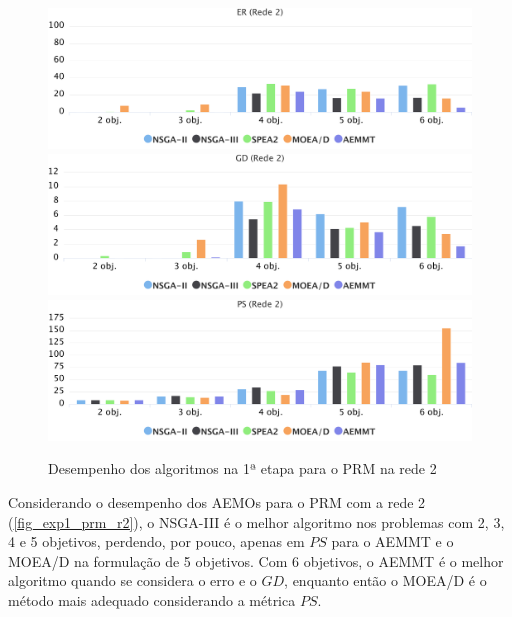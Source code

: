\begin{figure}[!htbp]	
	\includegraphics[width=1\textwidth]{cap_experimentos/figs/etapa1/er-mrp-r2}
	\includegraphics[width=1\textwidth]{cap_experimentos/figs/etapa1/gd-mrp-r2}
	\includegraphics[width=1\textwidth]{cap_experimentos/figs/etapa1/ps-mrp-r2}
	\caption{\label{fig_exp1_prm_r2}Desempenho dos algoritmos na 1ª etapa para o PRM na rede 2}
\end{figure}

Considerando o desempenho dos AEMOs para o PRM com a rede 2 (\autoref{fig_exp1_prm_r2}), o NSGA-III é o melhor algoritmo nos problemas com 2, 3, 4 e 5 objetivos, perdendo, por pouco, apenas em $PS$ para o AEMMT e o MOEA/D na formulação de 5 objetivos. Com 6 objetivos, o AEMMT é o melhor algoritmo quando se considera o erro e o $GD$, enquanto então o MOEA/D é o método mais adequado considerando a métrica $PS$.

